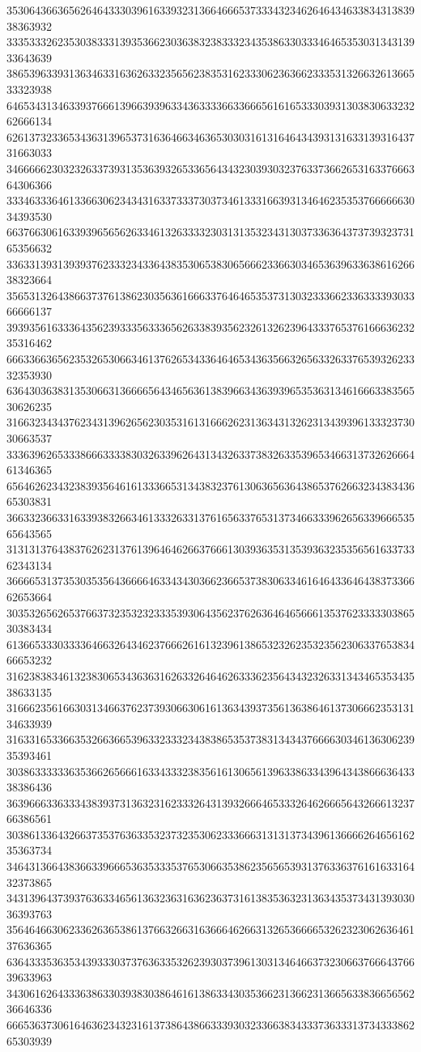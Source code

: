 35306436636562646433303961633932313664666537333432346264643463383431383938363932
33353332623530383331393536623036383238333234353863303334646535303134313933643639
38653963393136346331636263323565623835316233306236366233353132663261366533323938
64653431346339376661396639396334363333663366656161653330393130383063323262666134
62613732336534363139653731636466346365303031613164643439313163313931643731663033
34666662303232633739313536393265336564343230393032376337366265316337666364306366
33346333646133663062343431633733373037346133316639313464623535376666663034393530
66376630616339396565626334613263333230313135323431303733636437373932373165356632
33633139313939376233323433643835306538306566623366303465363963363861626638323664
35653132643866373761386230356361666337646465353731303233366233633339303366666137
39393561633364356239333563336562633839356232613262396433376537616663623235316462
66633663656235326530663461376265343364646534363566326563326337653932623332353930
63643036383135306631366665643465636138396634363939653536313461666338356530626235
31663234343762343139626562303531613166626231363431326231343939613332373030663537
33363962653338666333383032633962643134326337383263353965346631373262666461346365
65646262343238393564616133366531343832376130636563643865376266323438343665303831
36633236633163393832663461333263313761656337653137346633396265633966653565643565
31313137643837626231376139646462663766613039363531353936323535656163373362343134
36666531373530353564366664633434303662366537383063346164643364643837336662653664
30353265626537663732353232333539306435623762636464656661353762333330386530383434
61366533303333646632643462376662616132396138653232623532356230633765383466653232
31623838346132383065343636316263326464626333623564343232633134346535343538633135
31666235616630313466376237393066306161363439373561363864613730666235313134633939
31633165336635326636653963323332343838653537383134343766663034613630623935393461
30386333333635366265666163343332383561613065613963386334396434386663643338386436
36396663363334383937313632316233326431393266646533326462666564326661323766386561
30386133643266373537636335323732353062333666313131373439613666626465616235363734
34643136643836633966653635333537653066353862356565393137633637616163316432373865
34313964373937636334656136323631636236373161383536323136343537343139303036393763
35646466306233626365386137663266316366646266313265366665326232306263646137636365
63643335363534393330373763633532623930373961303134646637323066376664376639633963
34306162643336386330393830386461613863343035366231366231366563383665656236646336
66653637306164636234323161373864386633393032336638343337363331373433386265303939
